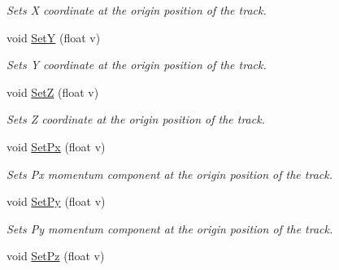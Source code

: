 \begin{DoxyCompactItemize}
\begin{DoxyCompactList}\small\item\em Sets X coordinate at the origin position of the track. \end{DoxyCompactList}\item 
void \hyperlink{classKFMCTrack_a1eee8ab8b857e1df2f838e071f7eb2be}{SetY} (float v)\hypertarget{classKFMCTrack_a1eee8ab8b857e1df2f838e071f7eb2be}{}\label{classKFMCTrack_a1eee8ab8b857e1df2f838e071f7eb2be}

\begin{DoxyCompactList}\small\item\em Sets Y coordinate at the origin position of the track. \end{DoxyCompactList}\item 
void \hyperlink{classKFMCTrack_ac3764ac661f38b2794516a8343b382a9}{SetZ} (float v)\hypertarget{classKFMCTrack_ac3764ac661f38b2794516a8343b382a9}{}\label{classKFMCTrack_ac3764ac661f38b2794516a8343b382a9}

\begin{DoxyCompactList}\small\item\em Sets Z coordinate at the origin position of the track. \end{DoxyCompactList}\item 
void \hyperlink{classKFMCTrack_ae3de4de46304b5dd10fc0aaca485273e}{Set\+Px} (float v)\hypertarget{classKFMCTrack_ae3de4de46304b5dd10fc0aaca485273e}{}\label{classKFMCTrack_ae3de4de46304b5dd10fc0aaca485273e}

\begin{DoxyCompactList}\small\item\em Sets Px momentum component at the origin position of the track. \end{DoxyCompactList}\item 
void \hyperlink{classKFMCTrack_a5cc227a890fa1d9becec4c9efea5885e}{Set\+Py} (float v)\hypertarget{classKFMCTrack_a5cc227a890fa1d9becec4c9efea5885e}{}\label{classKFMCTrack_a5cc227a890fa1d9becec4c9efea5885e}

\begin{DoxyCompactList}\small\item\em Sets Py momentum component at the origin position of the track. \end{DoxyCompactList}\item 
void \hyperlink{classKFMCTrack_ae3f18e9869735ca8f6445a543e92de18}{Set\+Pz} (float v)\hypertarget{classKFMCTrack_ae3f18e9869735ca8f6445a543e92de18}{}\label{classKFMCTrack_ae3f18e9869735ca8f6445a543e92de18}


\end{DoxyCompactItemize}
